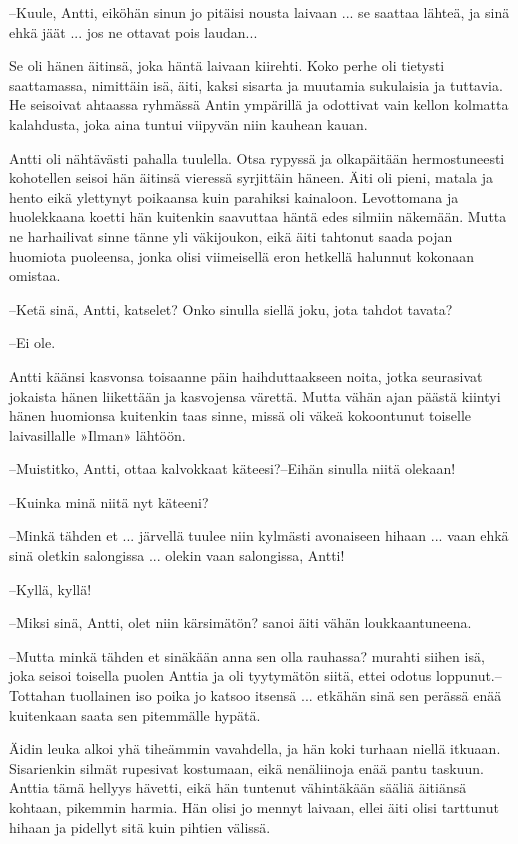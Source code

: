 \documentclass[a4paper,finnish,12pt]{scrartcl}
\begin{document}
--Kuule, Antti, eiköhän sinun jo pitäisi nousta laivaan ... se saattaa
lähteä, ja sinä ehkä jäät ... jos ne ottavat pois laudan...

Se oli hänen äitinsä, joka häntä laivaan kiirehti. Koko perhe oli
tietysti saattamassa, nimittäin isä, äiti, kaksi sisarta ja muutamia
sukulaisia ja tuttavia. He seisoivat ahtaassa ryhmässä Antin ympärillä
ja odottivat vain kellon kolmatta kalahdusta, joka aina tuntui viipyvän
niin kauhean kauan.

Antti oli nähtävästi pahalla tuulella. Otsa rypyssä ja olkapäitään
hermostuneesti kohotellen seisoi hän äitinsä vieressä syrjittäin
häneen. Äiti oli pieni, matala ja hento eikä ylettynyt poikaansa kuin
parahiksi kainaloon. Levottomana ja huolekkaana koetti hän kuitenkin
saavuttaa häntä edes silmiin näkemään. Mutta ne harhailivat sinne tänne
yli väkijoukon, eikä äiti tahtonut saada pojan huomiota puoleensa,
jonka olisi viimeisellä eron hetkellä halunnut kokonaan omistaa.

--Ketä sinä, Antti, katselet? Onko sinulla siellä joku, jota tahdot
tavata?

--Ei ole.

Antti käänsi kasvonsa toisaanne päin haihduttaakseen noita, jotka
seurasivat jokaista hänen liikettään ja kasvojensa värettä. Mutta vähän
ajan päästä kiintyi hänen huomionsa kuitenkin taas sinne, missä oli
väkeä kokoontunut toiselle laivasillalle »Ilman» lähtöön.

--Muistitko, Antti, ottaa kalvokkaat käteesi?--Eihän sinulla niitä
olekaan!

--Kuinka minä niitä nyt käteeni?

--Minkä tähden et ... järvellä tuulee niin kylmästi avonaiseen
hihaan ... vaan ehkä sinä oletkin salongissa ... olekin vaan
salongissa, Antti!

--Kyllä, kyllä!

--Miksi sinä, Antti, olet niin kärsimätön? sanoi äiti vähän
loukkaantuneena.

--Mutta minkä tähden et sinäkään anna sen olla rauhassa? murahti siihen
isä, joka seisoi toisella puolen Anttia ja oli tyytymätön siitä, ettei
odotus loppunut.--Tottahan tuollainen iso poika jo katsoo itsensä ...
etkähän sinä sen perässä enää kuitenkaan saata sen pitemmälle hypätä.

Äidin leuka alkoi yhä tiheämmin vavahdella, ja hän koki turhaan niellä
itkuaan. Sisarienkin silmät rupesivat kostumaan, eikä nenäliinoja enää
pantu taskuun. Anttia tämä hellyys hävetti, eikä hän tuntenut
vähintäkään sääliä äitiänsä kohtaan, pikemmin harmia. Hän olisi jo
mennyt laivaan, ellei äiti olisi tarttunut hihaan ja pidellyt sitä kuin
pihtien välissä.
\end{document}
